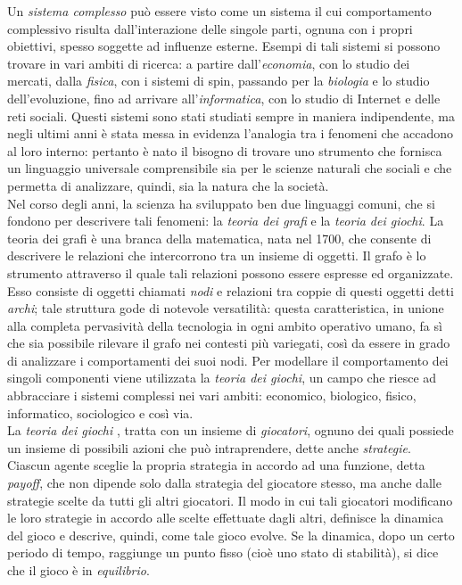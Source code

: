 Un \textit{sistema complesso} può essere visto come un sistema il cui comportamento complessivo risulta dall’interazione delle singole parti, ognuna con i propri obiettivi, spesso soggette ad influenze esterne. Esempi di tali sistemi si possono trovare in vari ambiti di ricerca: a partire dall’\textit{economia}, con lo studio dei mercati, dalla \textit{fisica}, con i sistemi di spin, passando per la \textit{biologia} e lo studio dell’evoluzione, fino ad arrivare all’\textit{informatica}, con lo studio di Internet e delle reti sociali. Questi sistemi sono stati studiati sempre in maniera indipendente, ma negli ultimi anni è stata messa in evidenza l’analogia tra i fenomeni che accadono al loro interno: pertanto è nato il bisogno di trovare uno strumento che fornisca un linguaggio universale comprensibile sia per le scienze naturali che sociali e che permetta di analizzare, quindi, sia la natura che la società.\\
Nel corso degli anni, la scienza ha sviluppato ben due linguaggi comuni, che si fondono per descrivere tali fenomeni: la \textit{teoria dei grafi} e la \textit{teoria dei giochi}. La teoria dei grafi \cite{easley2010networks} è una branca della matematica, nata nel 1700, che consente di descrivere le relazioni che intercorrono tra un insieme di oggetti. Il grafo è lo strumento attraverso il quale tali relazioni possono essere espresse ed organizzate. Esso consiste di oggetti chiamati \textit{nodi} e relazioni tra coppie di questi oggetti detti \textit{archi}; tale struttura gode di notevole versatilità: questa caratteristica, in unione alla completa pervasività della tecnologia in ogni ambito operativo umano, fa sì che sia possibile rilevare il grafo nei contesti più variegati, così da essere in grado di analizzare i comportamenti dei suoi nodi. Per modellare il comportamento dei singoli componenti viene utilizzata la \textit{teoria dei giochi}, un campo che riesce ad abbracciare i sistemi complessi nei vari ambiti: economico, biologico, fisico, informatico, sociologico e così via.\\
La \textit{teoria dei giochi} \cite{easley2010networks}, tratta con un insieme di \textit{giocatori}, ognuno dei quali possiede un insieme di possibili azioni che può intraprendere, dette anche \textit{strategie}. Ciascun agente sceglie la propria strategia in accordo ad una funzione, detta \textit{payoff}, che non dipende solo dalla strategia del giocatore stesso, ma anche dalle strategie scelte da tutti gli altri giocatori. Il modo in cui tali giocatori modificano le loro strategie in accordo alle scelte effettuate dagli altri, definisce la dinamica del gioco e descrive, quindi, come tale gioco evolve. Se la dinamica, dopo un certo periodo di tempo, raggiunge un punto fisso (cioè uno stato di stabilità), si dice che il gioco è in \textit{equilibrio}.\\
